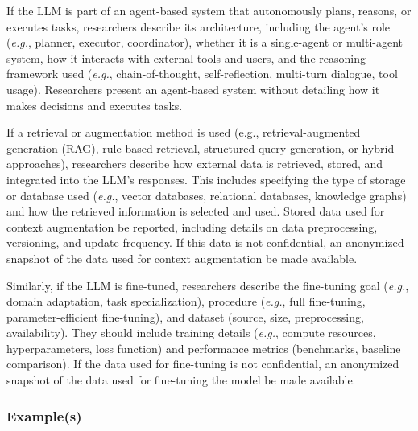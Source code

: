 
If the LLM is part of an agent-based system that autonomously plans, reasons, or executes tasks, researchers \must describe its architecture, including the agent's role (\textit{e.g.}, planner, executor, coordinator), whether it is a single-agent or multi-agent system, how it interacts with external tools and users, and the reasoning framework used (\textit{e.g.}, chain-of-thought, self-reflection, multi-turn dialogue, tool usage). Researchers \mustnot present an agent-based system without detailing how it makes decisions and executes tasks.


If a retrieval or augmentation method is used (e.g., retrieval-augmented generation (RAG), rule-based retrieval, structured query generation, or hybrid approaches), researchers \must describe how external data is retrieved, stored, and integrated into the LLM's responses. This includes specifying the type of storage or database used (\textit{e.g.}, vector databases, relational databases, knowledge graphs) and how the retrieved information is selected and used. Stored data used for context augmentation \must be reported, including details on data preprocessing, versioning, and update frequency. If this data is not confidential, an anonymized snapshot of the data used for context augmentation \should be made available.

Similarly, if the LLM is fine-tuned, researchers \must describe the fine-tuning goal (\textit{e.g.}, domain adaptation, task specialization), procedure (\textit{e.g.}, full fine-tuning, parameter-efficient fine-tuning), and dataset (source, size, preprocessing, availability). They should include training details (\textit{e.g.}, compute resources, hyperparameters, loss function) and performance metrics (benchmarks, baseline comparison). If the data used for fine-tuning is not confidential, an anonymized snapshot of the data used for fine-tuning the model \should be made available.



\subsubsection{Example(s)}

